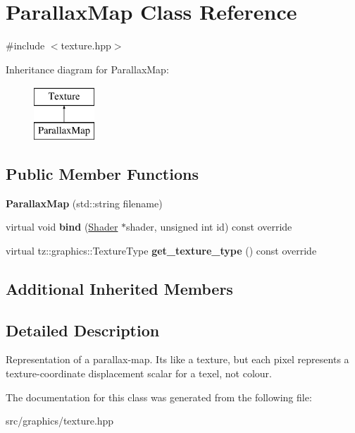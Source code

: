 \hypertarget{class_parallax_map}{}\section{Parallax\+Map Class Reference}
\label{class_parallax_map}


{\ttfamily \#include $<$texture.\+hpp$>$}

Inheritance diagram for Parallax\+Map\+:\begin{figure}[H]
\begin{center}
\leavevmode
\includegraphics[height=2.000000cm]{class_parallax_map}
\end{center}
\end{figure}
\subsection*{Public Member Functions}
\begin{DoxyCompactItemize}
\item 
\mbox{\label{class_parallax_map_a0d7a4d44bf8c5cd8dd920938d6d1e0d2}} 
{\bfseries Parallax\+Map} (std\+::string filename)
\item 
\mbox{\label{class_parallax_map_a2c894a6060a338e9e5c9830bd4c5e93a}} 
virtual void {\bfseries bind} (\mbox{\hyperlink{class_shader}{Shader}} $\ast$shader, unsigned int id) const override
\item 
\mbox{\label{class_parallax_map_a56dba3af3087e0f6de74150685881415}} 
virtual tz\+::graphics\+::\+Texture\+Type {\bfseries get\+\_\+texture\+\_\+type} () const override
\end{DoxyCompactItemize}
\subsection*{Additional Inherited Members}


\subsection{Detailed Description}
Representation of a parallax-\/map. It\textquotesingle{}s like a texture, but each pixel represents a texture-\/coordinate displacement scalar for a texel, not colour. 

The documentation for this class was generated from the following file\+:\begin{DoxyCompactItemize}
\item 
src/graphics/texture.\+hpp\end{DoxyCompactItemize}
